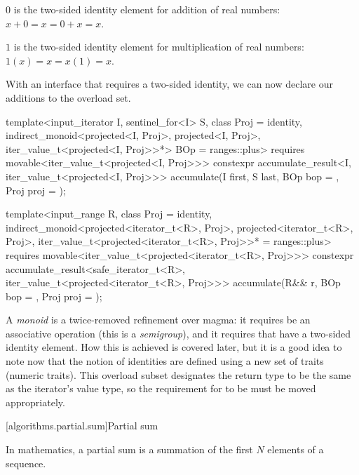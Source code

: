 \pnum
\begin{example}
   $0$ is the two-sided identity element for addition of real numbers: $x + 0 = x = 0 + x = x$.
\end{example}

\pnum
\begin{example}
   $1$ is the two-sided identity element for multiplication of real numbers: $1(x) = x = x(1) = x$.
\end{example}

With an interface that requires a two-sided identity, we can now declare our additions to the
 overload set.

\begin{itemdecl}
template<input_iterator I, sentinel_for<I> S, class Proj = identity,
         indirect_monoid<projected<I, Proj>, projected<I, Proj>,
                         iter_value_t<projected<I, Proj>>*> BOp = ranges::plus>
  requires movable<iter_value_t<projected<I, Proj>>>
constexpr accumulate_result<I, iter_value_t<projected<I, Proj>>>
  accumulate(I first, S last, BOp bop = {}, Proj proj = {});

template<input_range R, class Proj = identity,
         indirect_monoid<projected<iterator_t<R>, Proj>,
                         projected<iterator_t<R>, Proj>,
                         iter_value_t<projected<iterator_t<R>, Proj>>* = ranges::plus>
  requires movable<iter_value_t<projected<iterator_t<R>, Proj>>>
constexpr accumulate_result<safe_iterator_t<R>, iter_value_t<projected<iterator_t<R>, Proj>>>
  accumulate(R&& r, BOp bop = {}, Proj proj = {});
\end{itemdecl}
\begin{itemdescr}
A \textit{monoid} is a twice-removed refinement over magma: it requires  be an
associative operation (this is a \textit{semigroup}\cite{wikipedia_semigroup}), and it requires that
 have a two-sided identity element\cite{wikipedia_monoid}. How this is achieved is
covered later, but it is a good idea to note now that the notion of identities are defined using a
new set of traits (numeric traits). This overload subset designates the return type to be the same
as the iterator's value type, so the requirement for  to be  must be moved
appropriately.
\end{itemdescr}

[algorithms.partial.sum]{Partial sum}

In mathematics, a partial sum is a summation of the first $N$ elements of a
sequence\cite{wolfram-partial-sum}.

